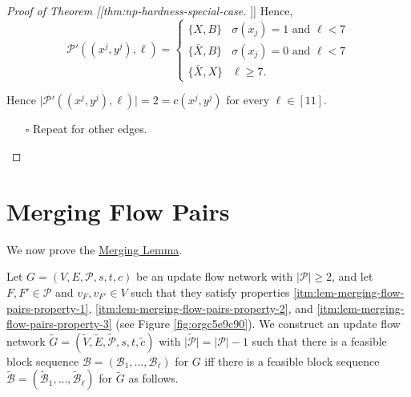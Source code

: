 \documentclass[fontsize=11pt,paper=a4]{book}
\begin{document}
\begin{proof}[Proof of Theorem [[thm:np-hardness-special-case]]]
Hence,
\[\mathcal{P}'((x^j,y^j),\ell)=
\begin{cases}
\{X,B\} & \sigma(x_j)=1\text{ and }\ell<7\\
\{\bar{X},B\} & \sigma(x_j)=0\text{ and }\ell<7\\
\{\bar{X},X\} & \ell\geq 7.
\end{cases}\]

Hence \(\lvert\mathcal{P}'((x^j,y^j),\ell)\rvert=2=c(x^j,y^j)\) for every \(\ell\in[11]\).

\begin{itemize}
\item[{$\square$}] Repeat for other edges.
\end{itemize}
\end{proof}

\chapter{Merging Flow Pairs}
\label{sec:org3273c0d}

We now prove the \hyperref[org44b4347]{Merging Lemma}.

Let \(G=(V,E,\mathcal{P},s,t,c)\) be an update flow network with \(\lvert\mathcal{P}\rvert\geq 2\), and let \(F,F'\in\mathcal{P}\) and \(v_F,v_{F'}\in V\) such that they satisfy properties \ref{itm:lem-merging-flow-pairs-property-1}, \ref{itm:lem-merging-flow-pairs-property-2}, and \ref{itm:lem-merging-flow-pairs-property-3} (see Figure \ref{fig:orgc5e9c90}).
We construct an update flow network \(\tilde{G}=(\tilde{V},\tilde{E},\tilde{\mathcal{P}},s,t,\tilde{c})\) with \(\lvert\tilde{\mathcal{P}}\rvert=\lvert\mathcal{P}\rvert-1\) such that there is a feasible block sequence \(\mathcal{B}=(\mathscr{B}_1,\dots,\mathscr{B}_{\ell})\) for \(G\) iff there is a feasible block sequence \(\tilde{\mathcal{B}}=(\tilde{\mathscr{B}}_1,\dots,\tilde{\mathscr{B}}_{\ell})\) for \(\tilde{G}\) as follows.
\end{document}
